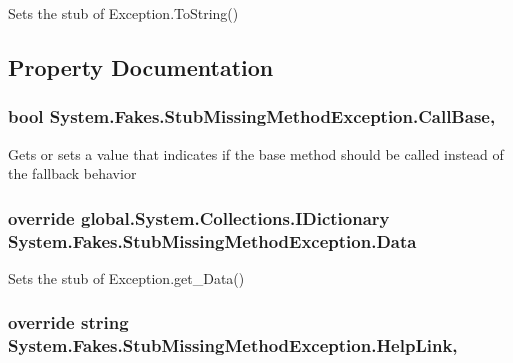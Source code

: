 Sets the stub of Exception.\-To\-String()



\subsection{Property Documentation}
\hypertarget{class_system_1_1_fakes_1_1_stub_missing_method_exception_a898be17b8d0bd6530200dc22d2ca12d5}{
\subsubsection[{Call\-Base}]{\setlength{\rightskip}{0pt plus 5cm}bool System.\-Fakes.\-Stub\-Missing\-Method\-Exception.\-Call\-Base\hspace{0.3cm}{\ttfamily [get]}, {\ttfamily [set]}}}\label{class_system_1_1_fakes_1_1_stub_missing_method_exception_a898be17b8d0bd6530200dc22d2ca12d5}


Gets or sets a value that indicates if the base method should be called instead of the fallback behavior

\hypertarget{class_system_1_1_fakes_1_1_stub_missing_method_exception_a18d010f0773ce7937ae766eec9f59e36}{
\subsubsection[{Data}]{\setlength{\rightskip}{0pt plus 5cm}override global.\-System.\-Collections.\-I\-Dictionary System.\-Fakes.\-Stub\-Missing\-Method\-Exception.\-Data\hspace{0.3cm}{\ttfamily [get]}}}\label{class_system_1_1_fakes_1_1_stub_missing_method_exception_a18d010f0773ce7937ae766eec9f59e36}


Sets the stub of Exception.\-get\-\_\-\-Data()

\hypertarget{class_system_1_1_fakes_1_1_stub_missing_method_exception_a232306efba00acc1ebc426224826b4c7}{
\subsubsection[{Help\-Link}]{\setlength{\rightskip}{0pt plus 5cm}override string System.\-Fakes.\-Stub\-Missing\-Method\-Exception.\-Help\-Link\hspace{0.3cm}{\ttfamily [get]}, {\ttfamily [set]}}}\label{class_system_1_1_fakes_1_1_stub_missing_method_exception_a232306efba00acc1ebc426224826b4c7}


